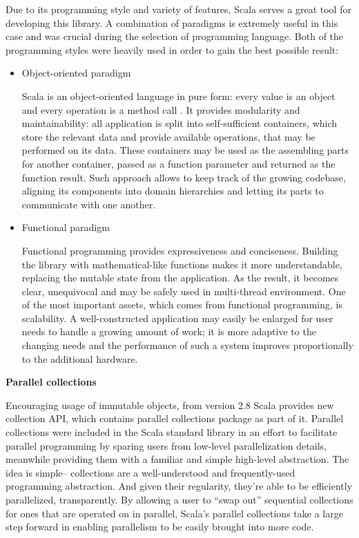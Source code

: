 
Due to its programming style and variety of features, Scala serves a great tool for developing this library. A combination of paradigms is extremely useful in this case and was crucial during the selection of programming language. Both of the programming styles were heavily used in order to gain the best possible result:
\begin{itemize}
\item
Object-oriented paradigm

Scala is an object-oriented language in pure form: every value is an object and every operation is a method call \cite{programming_in_scala}. It provides modularity and maintainability: all application is split into self-sufficient containers, which store the relevant data and provide available operations, that may be performed on its data. These containers may be used as the assembling parts for another container, passed as a function parameter and returned as the function result. Such approach allows to keep track of the growing codebase, aligning its components into domain hierarchies and letting its parts to communicate with one another.

\item
Functional paradigm

Functional programming provides expressiveness and conciseness. Building the library with mathematical-like functions makes it more understandable, replacing the mutable state from the application. As the result, it becomes clear, unequivocal and may be safely used in multi-thread environment. One of the most important assets, which comes from functional programming, is scalability. A well-constructed application may easily be enlarged for user needs to handle a growing amount of work; it is more adaptive to the changing needs and the performance of such a system improves proportionally to the additional hardware.

\end{itemize} 

 \textbf{Parallel collections}

 Encouraging usage of immutable objects, from version 2.8 Scala provides new collection API, which contains parallel collections package as part of it. Parallel collections were included in the Scala standard library in an effort to facilitate parallel programming by sparing users from low-level parallelization details, meanwhile providing them with a familiar and simple high-level abstraction. The idea is simple– collections are a well-understood and frequently-used programming abstraction. And given their regularity, they’re able to be efficiently parallelized, transparently. By allowing a user to “swap out” sequential collections for ones that are operated on in parallel, Scala’s parallel collections take a large step forward in enabling parallelism to be easily brought into more code. \cite{scala_parallel_collections_overview}

